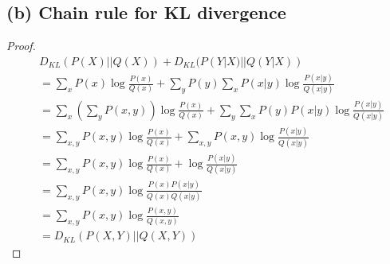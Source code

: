 \documentclass[11pt]{article}
\begin{document}
	\newpage
	\subsection{(b) Chain rule for KL divergence}
	\begin{proof}
		\begin{align}
		&D_{KL}(P(X) || Q(X)) + D_{KL}(P(Y|X)||Q(Y|X))\\
		&= \sum_x P(x) \log \frac{P(x)}{Q(x)} + \sum_y P(y) \sum_x P(x|y) \log \frac{P(x|y)}{Q(x|y)} \\
		&= \sum_x \left (\sum_y P(x, y) \right) \log \frac{P(x)}{Q(x)} + \sum_y \sum_x P(y) P(x|y) \log \frac{P(x|y)}{Q(x|y)} \\
		&= \sum_{x, y} P(x, y) \log \frac{P(x)}{Q(x)} + \sum_{x, y} P(x, y) \log \frac{P(x|y)}{Q(x|y)} \\
		&= \sum_{x, y} P(x, y) \log \frac{P(x)}{Q(x)} + \log \frac{P(x|y)}{Q(x|y)} \\
		&= \sum_{x, y} P(x, y) \log \frac{P(x)P(x|y)}{Q(x)Q(x|y)}\\
		&= \sum_{x, y} P(x, y) \log \frac{P(x, y)}{Q(x, y)} \\
		&= D_{KL}(P(X,Y)||Q(X,Y))
		\end{align}
	\end{proof}
	
	\newpage
\end{document}
